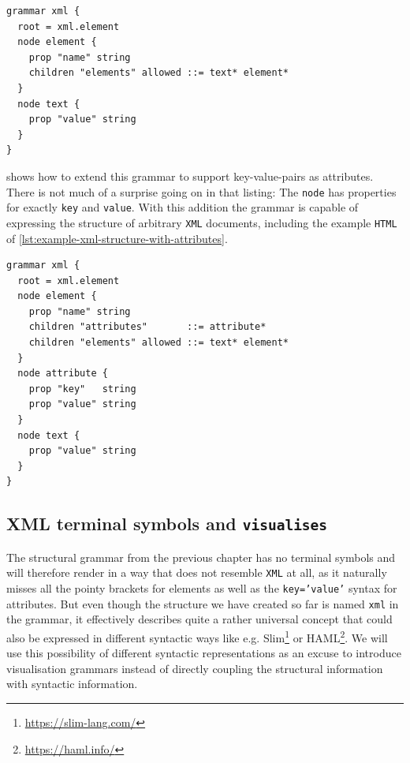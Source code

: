 \documentclass[]{report}
\begin{document}
\begin{listing}[H]
\begin{verbatim}
grammar xml {
  root = xml.element
  node element {
    prop "name" string
    children "elements" allowed ::= text* element*
  }
  node text {
    prop "value" string
  }
}
\end{verbatim}
\caption{XML Grammar: Explicitly \texttt{allowed} sequence}
\label{lst:xml-grammar-allowed}
\end{listing}

 shows how to extend this grammar to support key-value-pairs as attributes. There is not much of a surprise going on in that listing: The \texttt{node} has properties for exactly \texttt{key} and \texttt{value}. With this addition the grammar is capable of expressing the structure of arbitrary \texttt{XML} documents, including the example \texttt{HTML} of \cref{lst:example-xml-structure-with-attributes}.

\begin{listing}[H]
\begin{verbatim}
grammar xml {
  root = xml.element
  node element {
    prop "name" string
    children "attributes"       ::= attribute*
    children "elements" allowed ::= text* element*
  }
  node attribute {
    prop "key"   string
    prop "value" string
  }
  node text {
    prop "value" string
  }
}
\end{verbatim}
\caption{XML Grammar: Structure including attributes}
\label{lst:xml-grammar-structure}
\end{listing}

\subsection{XML terminal symbols and \texttt{visualises}}
\label{sec:possibility-separating-visualisation-from-structure}

The structural grammar from the previous chapter has no terminal symbols and will therefore render in a way that does not resemble \texttt{XML} at all, as it naturally misses all the pointy brackets for elements as well as the \texttt{key='value'} syntax for attributes. But even though the structure we have created so far is named \texttt{xml} in the grammar, it effectively describes quite a rather universal concept that could also be expressed in different syntactic ways like e.g. Slim\footnote{\url{https://slim-lang.com/}} or HAML\footnote{\url{https://haml.info/}}. We will use this possibility of different syntactic representations as an excuse to introduce visualisation grammars instead of directly coupling the structural information with syntactic information.
\end{document}
